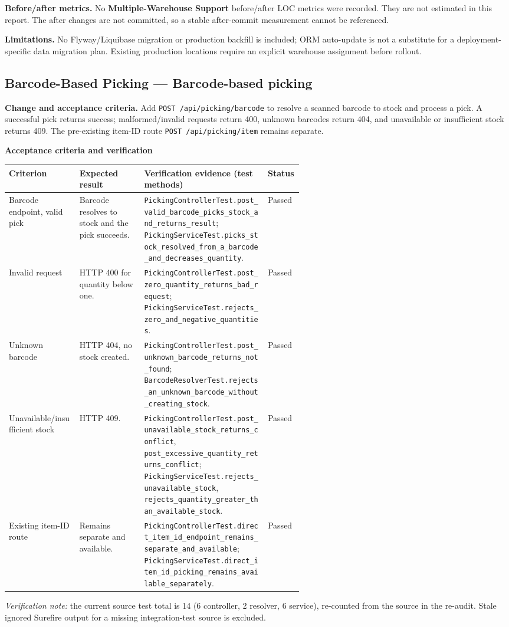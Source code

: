 \documentclass[11pt,a4paper]{article}
\newcommand{\code}[1]{\nolinkurl{#1}}
\begin{document}
\textbf{Before/after metrics.} No \textbf{Multiple-Warehouse Support} before/after LOC metrics were recorded. They are not estimated in this report. The after changes are not committed, so a stable after-commit measurement cannot be referenced.

\textbf{Limitations.} No Flyway/Liquibase migration or production backfill is included; ORM auto-update is not a substitute for a deployment-specific data migration plan. Existing production locations require an explicit warehouse assignment before rollout.

\subsection{\textbf{Barcode-Based Picking} --- Barcode-based picking}

\textbf{Change and acceptance criteria.} Add \code{POST /api/picking/barcode} to resolve a scanned barcode to stock and process a pick. A successful pick returns success; malformed/invalid requests return 400, unknown barcodes return 404, and unavailable or insufficient stock returns 409. The pre-existing item-ID route \code{POST /api/picking/item} remains separate.

\textbf{Acceptance criteria and verification}

\begin{tabularx}{\linewidth}{@{}P{0.24\linewidth}P{0.22\linewidth}YP{0.12\linewidth}@{}}
\toprule
Criterion & Expected result & Verification evidence (test methods) & Status\\
\midrule
Barcode endpoint, valid pick & Barcode resolves to stock and the pick succeeds. & \code{PickingControllerTest.post_valid_barcode_picks_stock_and_returns_result}; \code{PickingServiceTest.picks_stock_resolved_from_a_barcode_and_decreases_quantity}. & Passed\\
Invalid request & HTTP 400 for quantity below one. & \code{PickingControllerTest.post_zero_quantity_returns_bad_request}; \code{PickingServiceTest.rejects_zero_and_negative_quantities}. & Passed\\
Unknown barcode & HTTP 404, no stock created. & \code{PickingControllerTest.post_unknown_barcode_returns_not_found}; \code{BarcodeResolverTest.rejects_an_unknown_barcode_without_creating_stock}. & Passed\\
Unavailable/insufficient stock & HTTP 409. & \code{PickingControllerTest.post_unavailable_stock_returns_conflict}, \code{post_excessive_quantity_returns_conflict}; \code{PickingServiceTest.rejects_unavailable_stock}, \code{rejects_quantity_greater_than_available_stock}. & Passed\\
Existing item-ID route & Remains separate and available. & \code{PickingControllerTest.direct_item_id_endpoint_remains_separate_and_available}; \code{PickingServiceTest.direct_item_id_picking_remains_available_separately}. & Passed\\
\bottomrule
\end{tabularx}
\textit{Verification note:} the current source test total is 14 (6 controller, 2 resolver, 6 service), re-counted from the source in the re-audit. Stale ignored Surefire output for a missing integration-test source is excluded.
\end{document}
